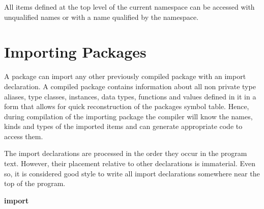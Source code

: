 All items defined at the top level of the current namespace can be
accessed with unqualified names or with a name qualified by the
namespace.


\section{Importing Packages} \label{import} 


A package can import any other previously compiled package with an import declaration.
A compiled package contains information about all non private type aliases, type classes, instances, 
data types, functions and values defined in it in a form that allows for quick reconstruction of the packages symbol table.
Hence, during compilation of the importing package the compiler will know the names, kinds and types of the imported items and can generate appropriate code to access them.

The import declarations are processed in the order they occur in the program text. 
However, their placement relative to other declarations is immaterial. 
Even so, it is considered good style to write all import declarations somewhere near the top of the program.

\begin{flushleft}
 \textbf{import}   {} \\
  \sym{(}  \sym{)} \\
   \\
  \oder{}    \oder{}  \oder{} 
  \oder{}   \oder{}  \\
  \oder {}   \oder {}  \\
 \sym{(}  \sym{)}\\
   \\
   \oder {}  \oder {}  \\
  \\
\end{flushleft}


